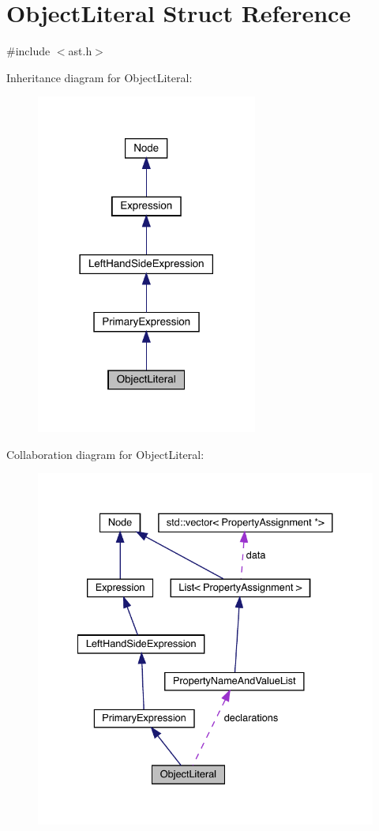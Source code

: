 \hypertarget{struct_object_literal}{}\section{Object\+Literal Struct Reference}
\label{struct_object_literal}


{\ttfamily \#include $<$ast.\+h$>$}



Inheritance diagram for Object\+Literal\+:\nopagebreak
\begin{figure}[H]
\begin{center}
\leavevmode
\includegraphics[width=206pt]{struct_object_literal__inherit__graph}
\end{center}
\end{figure}


Collaboration diagram for Object\+Literal\+:\nopagebreak
\begin{figure}[H]
\begin{center}
\leavevmode
\includegraphics[width=334pt]{struct_object_literal__coll__graph}
\end{center}
\end{figure}
